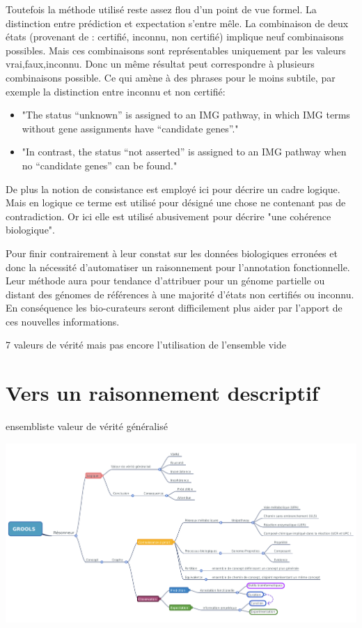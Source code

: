 \begin{refsegment}
Toutefois la méthode utilisé reste assez flou d'un point de vue formel. La distinction entre prédiction et expectation s'entre mêle. La combinaison de deux états (provenant de : certifié, inconnu, non certifié) implique neuf combinaisons possibles. Mais ces combinaisons sont représentables uniquement par les valeurs vrai,faux,inconnu. Donc un même résultat peut correspondre à plusieurs combinaisons possible. Ce qui amène à des phrases pour le moins subtile, par exemple la distinction entre inconnu et non certifié:
\begin{itemize}
    \item "The status “unknown” is assigned to an IMG pathway, in which IMG terms without gene assignments have “candidate genes”."
    \item "In contrast, the status “not asserted” is assigned to an IMG pathway when no “candidate genes” can be found."
\end{itemize}

De plus la notion de consistance est employé ici pour décrire un cadre logique. Mais en logique ce terme est utilisé pour désigné une chose ne contenant pas de contradiction. Or ici elle est utilisé abusivement pour décrire "une cohérence biologique".

Pour finir contrairement à leur constat sur les données biologiques erronées et donc la nécessité d'automatiser un raisonnement pour l'annotation fonctionnelle. Leur méthode aura pour tendance d'attribuer pour un génome partielle ou distant des génomes de références à une majorité d'états non certifiés ou inconnu. En conséquence les bio-curateurs seront difficilement plus aider par l'apport de ces nouvelles informations.


7 valeurs de vérité mais pas encore l'utilisation de l'ensemble vide


\section{Vers un raisonnement descriptif}
ensembliste valeur de vérité généralisé



\begin{shadedfigure}
    \centering
    \includegraphics[width=\textwidth]{img/GROOLS_mindmap.pdf}
    \caption{  }
    \label{fig:GROOLS_mindmap}
\end{shadedfigure}


\end{refsegment}
